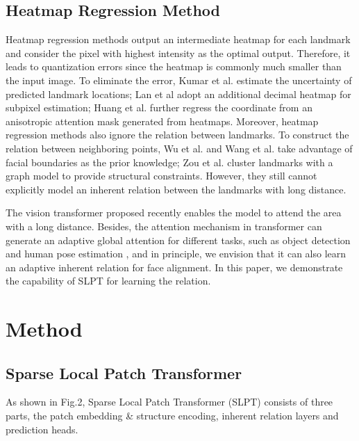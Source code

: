 \documentclass[10pt,twocolumn,letterpaper]{article}
\begin{document}
\subsection{Heatmap Regression Method}
Heatmap regression methods \cite{Hourglass, Dunet, HRnet, DeCaFA} output an intermediate heatmap for each landmark and consider the pixel with highest intensity as the optimal output. Therefore, it leads to quantization errors since the heatmap is commonly much smaller than the input image. To eliminate the error, Kumar et al. \cite{LUVLI} estimate the uncertainty of predicted landmark locations; Lan et al \cite{HIH} adopt an additional decimal heatmap for subpixel estimation; Huang et al. \cite{ADNet} further regress the coordinate from an anisotropic attention mask generated from heatmaps. Moreover, heatmap regression methods also ignore the relation between landmarks. To construct the relation between neighboring points, Wu et al. \cite{LAB} and Wang et al. \cite{Awing} take advantage of facial boundaries as the prior knowledge; Zou et al. \cite{HLSE} cluster landmarks with a graph model to provide structural constraints. However, they still cannot explicitly model an inherent relation between the landmarks with long distance.


The vision transformer \cite{VIT} proposed recently enables the model to attend the area with a long distance. Besides, the attention mechanism in transformer can generate an adaptive global attention for different tasks, such as object detection \cite{DETR, Deformable_DETR} and human pose estimation \cite{TokenPose}, and in principle, we envision that it can also learn an adaptive inherent relation for face alignment. In this paper, we demonstrate the capability of SLPT for learning the relation. 





\section{Method}
\subsection{Sparse Local Patch Transformer}
As shown in Fig.2, Sparse Local Patch Transformer (SLPT) consists of three parts, the patch embedding \& structure encoding, inherent relation layers and prediction heads.
\end{document}
